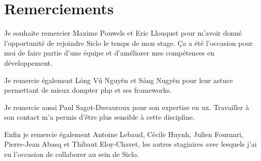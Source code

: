 \documentclass[rapport.tex]{subfiles}
\begin{document}
    \section*{Remerciements}
        Je souhaite remercier Maxime Pouwels et Eric Llouquet pour m'avoir donné
        l'opportunité de rejoindre Siclo le temps de mon stage. Ça a été l'occasion pour moi de faire partie d'une équipe et d'améliorer mes compétences en développement.

        Je remercie également Lóng Vũ Nguyên et Sáng Nugyên pour leur astuce permettant de mieux dompter php et ses frameworks.

        Je remercie aussi Paul Sagot-Duvauroux pour son expertise en \gls{ux}. Travailler à son contact m'a permis d'être plus sensible à cette discipline.

        Enfin je remercie également Antoine Lebaud, Cécile Huynh, Julien Fournari, Pierre-Jean Abasq et Thibaut Eloy-Chavet, les autres stagiaires avec lesquels j'ai eu l'occasion de collaborer au sein de Siclo.
\end{document}
